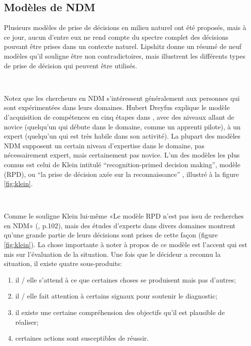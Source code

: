 \subsection{Modèles de NDM}

Plusieurs modèles de prise de décisions en milieu naturel ont été proposés, mais à ce jour,
aucun d’entre eux ne rend compte du spectre complet des décisions pouvant être prises dans un contexte naturel. Lipshitz \parencite{lipshitz1993converging} donne un résumé de neuf modèles qu’il souligne être non contradictoires, mais illustrent les différents types de prise de décision qui peuvent être utilisés.

~\par
Notez que les chercheurs en NDM s'intéressent généralement aux personnes qui sont expérimentées dans leurs domaines. Hubert Dreyfus explique le modèle d’acquisition de compétences en cinq étapes dans \parencite{dreyfus2014intuitive}, avec des niveaux allant de novice (quelqu'un qui débute dans  le domaine, comme un apprenti pilote), à un expert (quelqu'un qui est très habile dans son activité). La plupart des modèles NDM supposent un certain niveau d'expertise dans le domaine, pas nécessairement expert, mais certainement pas novice. L’un des modèles les plus connus est celui de Klein intitulé  “recognition-primed decision making”, modèle (RPD), ou “la prise de décision axée sur la reconnaissance” \parencite{klein2017sources}, illustré à la figure \ref{fig:klein}.

~\par 
Comme le souligne Klein lui-même «Le modèle RPD n'est pas issu de recherches en NDM» (\parencite{klein2017sources}, p.102), mais des études d’experts dans divers domaines montrent qu’une grande partie de leurs décisions sont prises de cette façon (figure \ref{fig:klein}). La chose importante à noter à propos de ce modèle est l'accent qui est mis sur l'évaluation de la situation. Une fois que le décideur a reconnu la situation, il existe quatre sous-produits:

\begin{enumerate}

\item il / elle s'attend à ce que certaines choses se produisent mais pas d'autres;
\item il / elle fait attention à certains signaux pour soutenir le diagnostic;
\item il existe une certaine compréhension des objectifs qu'il est plausible de réaliser;
\item certaines actions sont susceptibles de réussir.
\end{enumerate}

